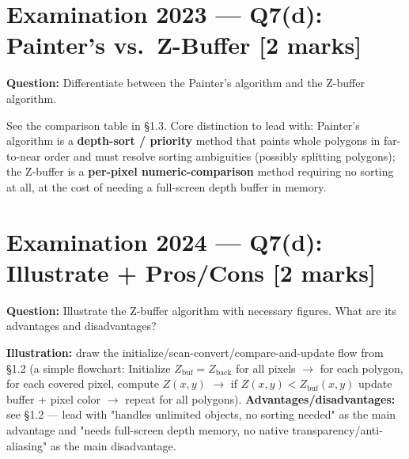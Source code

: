 \documentclass[12pt, a4paper]{article}
\newenvironment{solutionbox}{\begin{mdframed}[style=solutionframe]}{\end{mdframed}}
\newenvironment{answerbox}{\begin{mdframed}[style=answerframe]}{\end{mdframed}}
\begin{document}
\section{Examination 2023 --- Q7(d): Painter's vs.\ Z-Buffer [2 marks]}
\begin{solutionbox}
\textbf{Question:} Differentiate between the Painter's algorithm and the Z-buffer algorithm.
\end{solutionbox}
\begin{answerbox}
See the comparison table in \S1.3. Core distinction to lead with: Painter's algorithm is a \textbf{depth-sort / priority} method that paints whole polygons in far-to-near order and must resolve sorting ambiguities (possibly splitting polygons); the Z-buffer is a \textbf{per-pixel numeric-comparison} method requiring no sorting at all, at the cost of needing a full-screen depth buffer in memory.
\end{answerbox}

\section{Examination 2024 --- Q7(d): Illustrate + Pros/Cons [2 marks]}
\begin{solutionbox}
\textbf{Question:} Illustrate the Z-buffer algorithm with necessary figures. What are its advantages and disadvantages?
\end{solutionbox}
\begin{answerbox}
\textbf{Illustration:} draw the initialize/scan-convert/compare-and-update flow from \S1.2 (a simple flowchart: Initialize $Z_{\mathrm{buf}}=Z_{\mathrm{back}}$ for all pixels $\to$ for each polygon, for each covered pixel, compute $Z(x,y)$ $\to$ if $Z(x,y)<Z_{\mathrm{buf}}(x,y)$ update buffer + pixel color $\to$ repeat for all polygons). \textbf{Advantages/disadvantages:} see \S1.2 --- lead with "handles unlimited objects, no sorting needed" as the main advantage and "needs full-screen depth memory, no native transparency/anti-aliasing" as the main disadvantage.
\end{answerbox}

\end{document}
